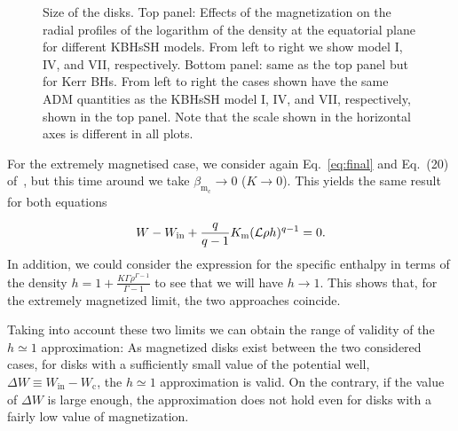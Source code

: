 \documentclass[twocolumn,aps,showpacs,showkeys,prd,superscriptaddress,byrevtex, amsmath]{revtex4-1}
\begin{document}
\begin{figure}
\hspace{-0.6cm}
\caption{Size of the disks. Top panel: Effects of the magnetization on the radial profiles of the logarithm of the density at the equatorial plane for different KBHsSH models. From left to right we show model I, IV, and VII, respectively. Bottom panel: same as the top panel but for Kerr BHs. From left to right the cases shown have the same ADM quantities as the KBHsSH model I, IV, and VII, respectively, shown in the top panel. Note that the scale shown in the horizontal axes is different in all plots.}
\label{radial_profiles}
\end{figure}


For the extremely magnetised case, we consider again Eq.~\eqref{eq:final} and Eq.~(20) of~\cite{Gimeno-Soler:2017}, but this time around we take $\beta_{\mathrm{m_c}} \rightarrow 0$ ($K \rightarrow 0$). This yields the same result for both equations

\begin{equation}
W - W_{\mathrm{in}} + \frac{q}{q-1}K_{\rm m}(\mathcal{L}\rho h)^{q-1}=0.
\end{equation}
In addition, we could consider the expression for the specific enthalpy in terms of the density $h = 1 + \frac{K\Gamma\rho^{\Gamma-1}}{\Gamma - 1}$ to 
see that we will have $h \rightarrow 1$. This shows that, for the extremely magnetized limit, the two approaches coincide.

Taking into account these two limits we can obtain the range of validity of the $h \simeq 1$ approximation: As magnetized disks exist between the two considered cases, for disks with a sufficiently small value of the potential well, $\Delta W \equiv W_{\mathrm{in}} - W_{\mathrm{c}}$, the $h \simeq 1$ approximation is valid. On the contrary, if the value of $\Delta W$ is large enough, the approximation does not hold even for disks with a fairly low value of magnetization.
\end{document}
